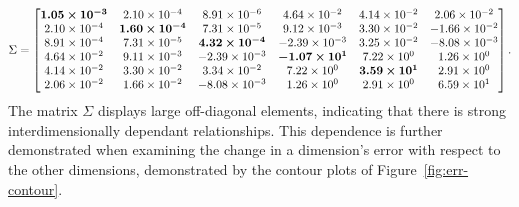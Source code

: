 \setlength{\arraycolsep}{3pt}
\begin{equation}
  \label{eq:covariance-matrix}
  \Sigma = 
  \begin{bmatrix}
    \bm{1.05\times 10^{-3}}  &  2.10\times 10^{-4}       &  8.91\times 10^{-6}       &  4.64\times 10^{-2}       &  4.14\times 10^{-2}      &  2.06\times 10^{-2}  \\
    2.10\times 10^{-4}       &  \bm{1.60\times 10^{-4}}  &  7.31\times 10^{-5}       &  9.12\times 10^{-3}       &  3.30\times 10^{-2}      & -1.66\times 10^{-2}  \\
    8.91\times 10^{-4}       &  7.31\times 10^{-5}       &  \bm{4.32\times 10^{-4}}  & -2.39\times 10^{-3}       &  3.25\times 10^{-2}      & -8.08\times 10^{-3}  \\
    4.64\times 10^{-2}       &  9.11\times 10^{-3}       & -2.39\times 10^{-3}       &  \bm{-1.07\times 10^{1}}  &  7.22\times 10^{0}       &  1.26\times 10^{0}   \\
    4.14\times 10^{-2}       &  3.30\times 10^{-2}       &  3.34\times 10^{-2}       &  7.22\times 10^{0}        &  \bm{3.59\times 10^{1}}  &  2.91\times 10^{0}   \\
    2.06\times 10^{-2}       &  1.66\times 10^{-2}       & -8.08\times 10^{-3}       &  1.26\times 10^{0}        &  2.91\times 10^{0}       &  6.59\times 10^{1}   \\
  \end{bmatrix}.
\end{equation}
The matrix $\Sigma$ displays large off-diagonal elements, indicating that there is strong interdimensionally dependant relationships. This dependence is further demonstrated when examining the change in a dimension's error with respect to the other dimensions, demonstrated by the contour plots of Figure~\ref{fig:err-contour}. 

